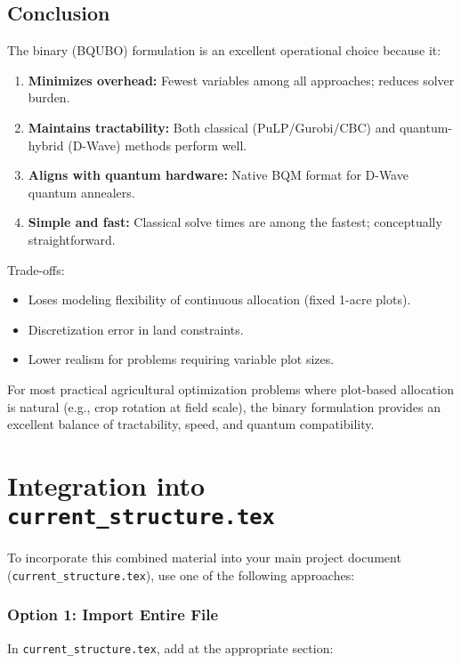 \documentclass[11pt,a4paper]{article}
\begin{document}
\subsection{Conclusion}

The binary (BQUBO) formulation is an excellent operational choice because it:

\begin{enumerate}
    \item \textbf{Minimizes overhead:} Fewest variables among all approaches; reduces solver burden.
    \item \textbf{Maintains tractability:} Both classical (PuLP/Gurobi/CBC) and quantum-hybrid (D-Wave) methods perform well.
    \item \textbf{Aligns with quantum hardware:} Native BQM format for D-Wave quantum annealers.
    \item \textbf{Simple and fast:} Classical solve times are among the fastest; conceptually straightforward.
\end{enumerate}

Trade-offs:
\begin{itemize}
    \item Loses modeling flexibility of continuous allocation (fixed 1-acre plots).
    \item Discretization error in land constraints.
    \item Lower realism for problems requiring variable plot sizes.
\end{itemize}

For most practical agricultural optimization problems where plot-based allocation is natural (e.g., crop rotation at field scale), the binary formulation provides an excellent balance of tractability, speed, and quantum compatibility.

\section{Integration into \texttt{current\_structure.tex}}

To incorporate this combined material into your main project document (\texttt{current\_structure.tex}), use one of the following approaches:

\subsubsection{Option 1: Import Entire File}

In \texttt{current\_structure.tex}, add at the appropriate section:
\begin{verbatim}

\end{verbatim}
\end{document}
